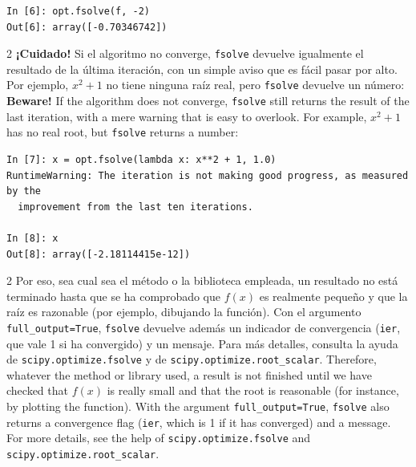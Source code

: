 \begin{verbatim}
In [6]: opt.fsolve(f, -2)
Out[6]: array([-0.70346742])
\end{verbatim}
\begin{paracol}{2}
\textbf{¡Cuidado!} Si el algoritmo no converge, \texttt{fsolve} devuelve igualmente el resultado de la última iteración, con un simple aviso que es fácil pasar por alto. Por ejemplo, $x^2+1$ no tiene ninguna raíz real, pero \texttt{fsolve} devuelve un número:
\switchcolumn
\textbf{Beware!} If the algorithm does not converge, \texttt{fsolve} still returns the result of the last iteration, with a mere warning that is easy to overlook. For example, $x^2+1$ has no real root, but \texttt{fsolve} returns a number:
\end{paracol}
\begin{verbatim}
In [7]: x = opt.fsolve(lambda x: x**2 + 1, 1.0)
RuntimeWarning: The iteration is not making good progress, as measured by the
  improvement from the last ten iterations.

In [8]: x
Out[8]: array([-2.18114415e-12])
\end{verbatim}
\begin{paracol}{2}
Por eso, sea cual sea el método o la biblioteca empleada, un resultado no está terminado hasta que se ha comprobado que $f(x)$ es realmente pequeño y que la raíz es razonable (por ejemplo, dibujando la función). Con el argumento \texttt{full\_output=True}, \texttt{fsolve} devuelve además un indicador de convergencia (\texttt{ier}, que vale 1 si ha convergido) y un mensaje. Para más detalles, consulta la ayuda de \texttt{scipy.optimize.fsolve} y de \texttt{scipy.optimize.root\_scalar}.
\switchcolumn
Therefore, whatever the method or library used, a result is not finished until we have checked that $f(x)$ is really small and that the root is reasonable (for instance, by plotting the function). With the argument \texttt{full\_output=True}, \texttt{fsolve} also returns a convergence flag (\texttt{ier}, which is 1 if it has converged) and a message. For more details, see the help of \texttt{scipy.optimize.fsolve} and \texttt{scipy.optimize.root\_scalar}.
\end{paracol}


